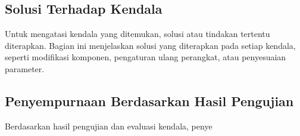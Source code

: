 \subsection{Solusi Terhadap Kendala}
Untuk mengatasi kendala yang ditemukan, solusi atau tindakan tertentu diterapkan. Bagian ini menjelaskan solusi yang diterapkan pada setiap kendala, seperti modifikasi komponen, pengaturan ulang perangkat, atau penyesuaian parameter.

\subsection{Penyempurnaan Berdasarkan Hasil Pengujian}
Berdasarkan hasil pengujian dan evaluasi kendala, penye
